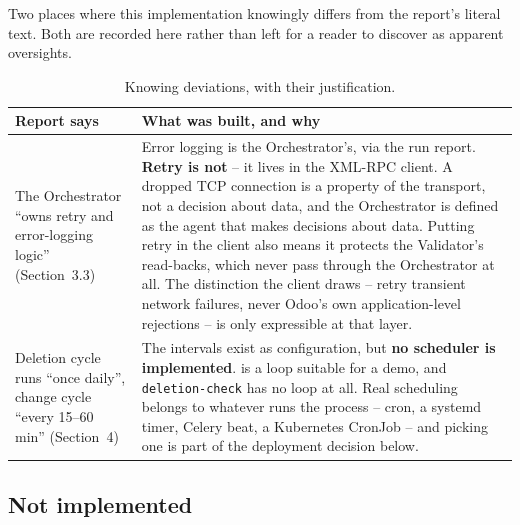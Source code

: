 \documentclass[11pt,a4paper]{article}
\newcommand{\ttu}[1]{\texttt{\detokenize{#1}}}
\begin{document}
Two places where this implementation knowingly differs from the report's literal text. Both are
recorded here rather than left for a reader to discover as apparent oversights.

\begin{table}[H]
\centering
\small
\begin{tabular}{@{}p{3.6cm}p{10.4cm}@{}}
\toprule
\textbf{Report says} & \textbf{What was built, and why} \\
\midrule
The Orchestrator ``owns retry and error-logging logic'' (Section~3.3) &
Error logging is the Orchestrator's, via the run report. \textbf{Retry is not} -- it lives in the
XML-RPC client. A dropped TCP connection is a property of the transport, not a decision about
data, and the Orchestrator is defined as the agent that makes decisions about data. Putting
retry in the client also means it protects the Validator's read-backs, which never pass through
the Orchestrator at all. The distinction the client draws -- retry transient network failures,
never Odoo's own application-level rejections -- is only expressible at that layer. \\
Deletion cycle runs ``once daily'', change cycle ``every 15--60 min'' (Section~4) &
The intervals exist as configuration, but \textbf{no scheduler is implemented}. \ttu{sync --loop}
is a \ttu{time.sleep} loop suitable for a demo, and \texttt{deletion-check} has no loop at all.
Real scheduling belongs to whatever runs the process -- cron, a systemd timer, Celery beat, a
Kubernetes CronJob -- and picking one is part of the deployment decision below. \\
\bottomrule
\end{tabular}
\caption{Knowing deviations, with their justification.}
\end{table}

\subsection{Not implemented}
\end{document}
